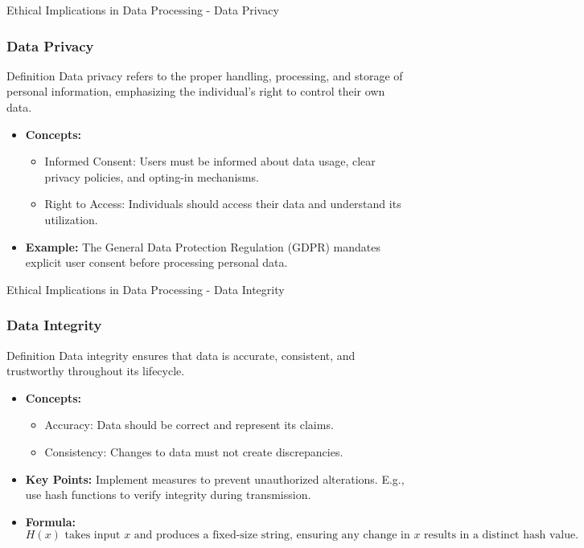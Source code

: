 \documentclass[aspectratio=169]{beamer}
\begin{document}
\begin{frame}[fragile]{Ethical Implications in Data Processing - Data Privacy}
    \frametitle{Data Privacy}
    
    \begin{block}{Definition}
        Data privacy refers to the proper handling, processing, and storage of personal information, emphasizing the individual's right to control their own data.
    \end{block}
    
    \begin{itemize}
        \item \textbf{Concepts:}
        \begin{itemize}
            \item Informed Consent: Users must be informed about data usage, clear privacy policies, and opting-in mechanisms.
            \item Right to Access: Individuals should access their data and understand its utilization.
        \end{itemize}
        
        \item \textbf{Example:} 
        The General Data Protection Regulation (GDPR) mandates explicit user consent before processing personal data.
    \end{itemize}
\end{frame}

\begin{frame}[fragile]{Ethical Implications in Data Processing - Data Integrity}
    \frametitle{Data Integrity}
    
    \begin{block}{Definition}
        Data integrity ensures that data is accurate, consistent, and trustworthy throughout its lifecycle.
    \end{block}
    
    \begin{itemize}
        \item \textbf{Concepts:}
        \begin{itemize}
            \item Accuracy: Data should be correct and represent its claims.
            \item Consistency: Changes to data must not create discrepancies.
        \end{itemize}
        
        \item \textbf{Key Points:} 
        Implement measures to prevent unauthorized alterations. E.g., use hash functions to verify integrity during transmission.
        
        \item \textbf{Formula:}
        \begin{equation}
            H(x) \text{ takes input } x \text{ and produces a fixed-size string, ensuring any change in } x \text{ results in a distinct hash value.}
        \end{equation}
    \end{itemize}
\end{frame}
\end{document}
